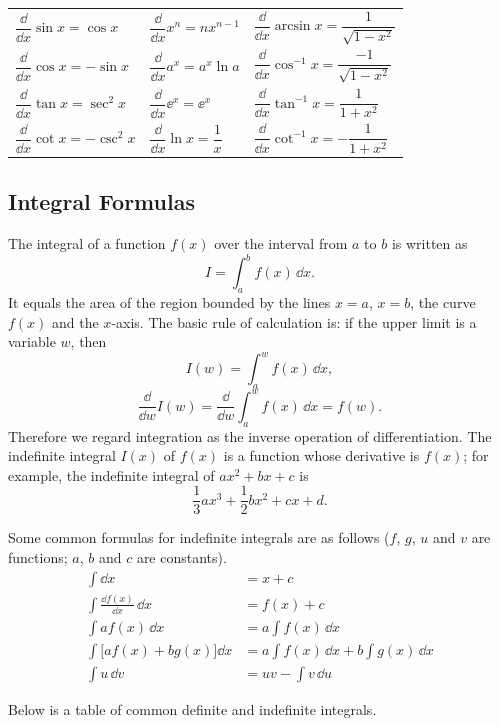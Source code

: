 \begin{center}
\small
\renewcommand{\arraystretch}{2.0}
\begin{tabular}{@{}lll@{}}
$\dfrac{\dd}{\dd x}\sin x=\cos x$ & $\dfrac{\dd}{\dd x}x^n=nx^{n-1}$ & $\dfrac{\dd}{\dd x}\arcsin x=\dfrac{1}{\sqrt{1-x^2}}$\\[4pt]
$\dfrac{\dd}{\dd x}\cos x=-\sin x$ & $\dfrac{\dd}{\dd x}a^x=a^x\ln a$ & $\dfrac{\dd}{\dd x}\cos^{-1}x=\dfrac{-1}{\sqrt{1-x^2}}$\\[4pt]
$\dfrac{\dd}{\dd x}\tan x=\sec^2x$ & $\dfrac{\dd}{\dd x}\ee^x=\ee^x$ & $\dfrac{\dd}{\dd x}\tan^{-1}x=\dfrac{1}{1+x^2}$\\[4pt]
$\dfrac{\dd}{\dd x}\cot x=-\csc^2x$ & $\dfrac{\dd}{\dd x}\ln x=\dfrac{1}{x}$ & $\dfrac{\dd}{\dd x}\cot^{-1}x=-\dfrac{1}{1+x^2}$
\end{tabular}
\end{center}

\subsection*{Integral Formulas}

The integral of a function $f(x)$ over the interval from $a$ to $b$ is written as
\[
I=\int_a^b f(x)\,\dd x.
\]
It equals the area of the region bounded by the lines $x=a$, $x=b$, the curve $f(x)$ and the $x$-axis. The basic rule of calculation is: if the upper limit is a variable $w$, then
\[
I(w)=\int_a^w f(x)\,\dd x,
\]
\[
\frac{\dd}{\dd w}I(w)=\frac{\dd}{\dd w}\int_a^w f(x)\,\dd x=f(w).
\]
Therefore we regard integration as the inverse operation of differentiation. The indefinite integral $I(x)$ of $f(x)$ is a function whose derivative is $f(x)$; for example, the indefinite integral of $ax^2+bx+c$ is
\[
\frac13ax^3+\frac12bx^2+cx+d.
\]

Some common formulas for indefinite integrals are as follows ($f$, $g$, $u$ and $v$ are functions; $a$, $b$ and $c$ are constants).
\begin{align*}
\int \dd x &= x+c\\
\int\frac{\dd f(x)}{\dd x}\,\dd x &= f(x)+c\\
\int a f(x)\,\dd x &= a\int f(x)\,\dd x\\
\int\bigl[a f(x)+b g(x)\bigr]\dd x &= a\int f(x)\,\dd x+b\int g(x)\,\dd x\\
\int u\,\dd v &= uv-\int v\,\dd u
\end{align*}

Below is a table of common definite and indefinite integrals.

